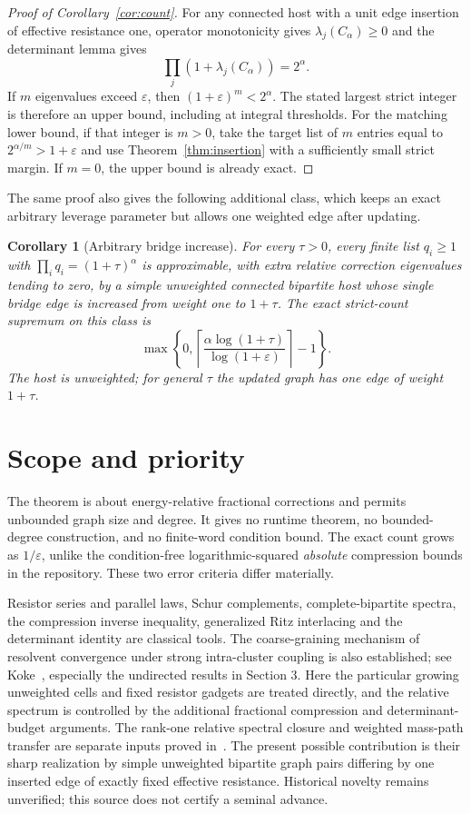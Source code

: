 \documentclass[11pt]{article}
\newtheorem{corollary}[theorem]{Corollary}
\begin{document}
\begin{proof}[Proof of Corollary~\ref{cor:count}]
For any connected host with a unit edge insertion of effective
resistance one, operator monotonicity gives $\lambda_j(C_\alpha)\ge0$
and the determinant lemma gives
\[
 \prod_j(1+\lambda_j(C_\alpha))=2^\alpha.
\]
If $m$ eigenvalues exceed $\varepsilon$, then
$(1+\varepsilon)^m<2^\alpha$. The stated largest strict integer is
therefore an upper bound, including at integral thresholds.
For the matching lower bound, if that integer is $m>0$, take the
target list of $m$ entries equal to $2^{\alpha/m}>1+\varepsilon$
and use Theorem~\ref{thm:insertion} with a sufficiently small strict
margin. If $m=0$, the upper bound is already exact.
\end{proof}

The same proof also gives the following additional class, which keeps
an exact arbitrary leverage parameter but allows one weighted edge
after updating.
\begin{corollary}[Arbitrary bridge increase]\label{cor:bridge}
For every $\tau>0$, every finite list $q_i\ge1$ with
$\prod_iq_i=(1+\tau)^\alpha$ is approximable, with extra relative
correction eigenvalues tending to zero, by a simple unweighted
connected bipartite host whose single bridge edge is increased from
weight one to $1+\tau$.
The exact strict-count supremum on this class is
\[
 \max\left\{0,\left\lceil
    \frac{\alpha\log(1+\tau)}{\log(1+\varepsilon)}
                           \right\rceil-1\right\}.
\]
The host is unweighted; for general $\tau$ the updated graph has one
edge of weight $1+\tau$.
\end{corollary}

\section{Scope and priority}
The theorem is about energy-relative fractional corrections and permits
unbounded graph size and degree. It gives no runtime theorem, no
bounded-degree construction, and no finite-word condition bound.
The exact count grows as $1/\varepsilon$, unlike the condition-free
logarithmic-squared \emph{absolute} compression bounds in the
repository. These two error criteria differ materially.

Resistor series and parallel laws, Schur complements, complete-bipartite
spectra, the compression inverse inequality, generalized Ritz
interlacing and the determinant identity are classical tools. The
coarse-graining mechanism of resolvent convergence under strong
intra-cluster coupling is also established; see Koke~\cite{Koke},
especially the undirected results in Section 3. Here the particular
growing unweighted cells and fixed resistor gadgets are treated
directly, and the relative spectrum is controlled by the additional
fractional compression and determinant-budget arguments.
The
rank-one relative spectral closure and weighted mass-path transfer
are separate inputs proved in~\cite{Relative}.
The present possible contribution is their sharp realization by
simple unweighted bipartite graph pairs differing by one inserted
edge of exactly fixed effective resistance. Historical novelty
remains unverified; this source does not certify a seminal advance.
\end{document}
